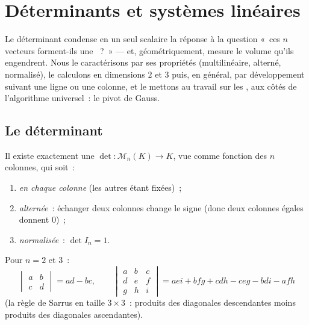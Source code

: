 \chapter{Déterminants et systèmes linéaires}\label{ch:b1:det}

Le déterminant condense en un seul scalaire la réponse à la question
«~ces $n$ vecteurs forment-ils une ~?~» --- et, géométriquement,
mesure le volume qu'ils engendrent. Nous le caractérisons par ses
propriétés (multilinéaire, alterné, normalisé), le calculons en
dimensions $2$ et $3$ puis, en général, par développement suivant une
ligne ou une colonne, et le mettons au travail sur les , aux côtés de l'algorithme universel~: le pivot de Gauss.

\section{Le déterminant}

\begin{theorem}[Caractérisation]\label{thm:b1:det:def}
Il existe exactement une  $\det \colon \mathcal{M}_n(K) \to K$,
vue comme fonction des $n$ colonnes, qui soit~:
\begin{enumerate}
  \item \emph{ en chaque colonne} (les autres étant fixées)~;
  \item \emph{alternée}~: échanger deux colonnes change le signe
        (donc deux colonnes égales donnent $0$)~;
  \item \emph{normalisée}~: $\det I_n = 1$.
\end{enumerate}
Pour $n = 2$ et $3$~:
\[
\begin{vmatrix} a & b\\ c & d\end{vmatrix} = ad - bc,
\qquad
\begin{vmatrix} a & b & c\\ d & e & f\\ g & h & i\end{vmatrix}
= aei + bfg + cdh - ceg - bdi - afh
\]
(la règle de Sarrus en taille $3 \times 3$~: produits des diagonales
descendantes moins produits des diagonales ascendantes).
\end{theorem}
\admitted

